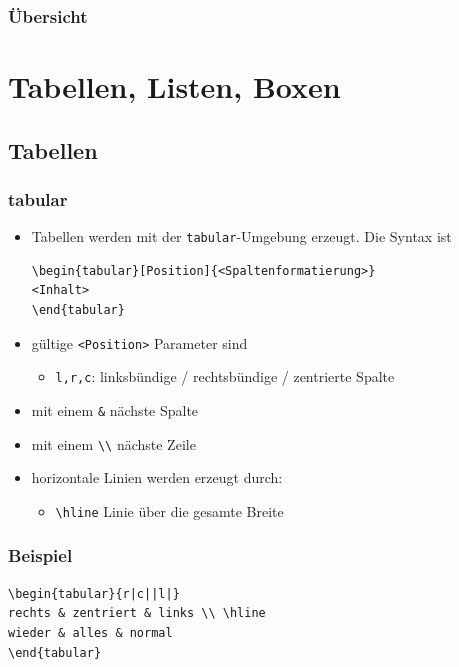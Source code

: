 \begin{frame}[fragile,t]
\frametitle{Übersicht}
\tableofcontents
\end{frame}
\section{Tabellen, Listen, Boxen}
\subsection{Tabellen}

\begin{frame}[fragile]
\frametitle{tabular}
\begin{itemize}[<+->]
  \item Tabellen werden mit der \texttt{tabular}-Umgebung erzeugt. Die Syntax ist 
    \begin{lstlisting}[style=Latex]
\begin{tabular}[Position]{<Spaltenformatierung>}
<Inhalt>
\end{tabular}
\end{lstlisting}\vspace{-20pt}
  \item gültige \texttt{<Position>} Parameter sind
  \begin{itemize}
    \item \texttt{l,r,c}: linksbündige / rechtsbündige / zentrierte Spalte
  \end{itemize}
  \item mit einem \lstinline[style=Latex]+&+ nächste Spalte
  \item mit einem \lstinline[style=Latex]+\\+ nächste Zeile
  \item horizontale Linien werden erzeugt durch:
  \begin{itemize}
    \item \lstinline[style=Latex]|\hline| Linie über die gesamte Breite
  \end{itemize}
\end{itemize}
\end{frame}


\begin{frame}[fragile,t]
\frametitle{Beispiel}
\begin{lstlisting}[style=Latex]
\begin{tabular}{r|c||l|}
rechts & zentriert & links \\ \hline
wieder & alles & normal
\end{tabular}
\end{lstlisting}
\pause\vspace{-20pt}
\end{frame}

